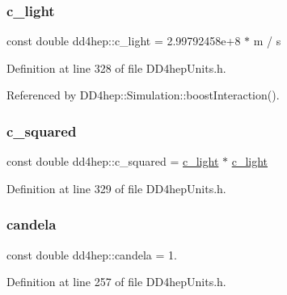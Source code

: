 \hypertarget{namespacedd4hep_abab5bebb73a5c3123d23fba7c326a0d5}{}\label{namespacedd4hep_abab5bebb73a5c3123d23fba7c326a0d5} 
\subsubsection{\texorpdfstring{c\+\_\+light}{c\_light}}
{\footnotesize\ttfamily const double dd4hep\+::c\+\_\+light = 2.\+99792458e+8 $\ast$ m / s\hspace{0.3cm}{\ttfamily [static]}}



Definition at line 328 of file D\+D4hep\+Units.\+h.



Referenced by D\+D4hep\+::\+Simulation\+::boost\+Interaction().

\hypertarget{namespacedd4hep_a1501a5f994e55104b62b1907ff652300}{}\label{namespacedd4hep_a1501a5f994e55104b62b1907ff652300} 
\subsubsection{\texorpdfstring{c\+\_\+squared}{c\_squared}}
{\footnotesize\ttfamily const double dd4hep\+::c\+\_\+squared = \hyperlink{namespacedd4hep_abab5bebb73a5c3123d23fba7c326a0d5}{c\+\_\+light} $\ast$ \hyperlink{namespacedd4hep_abab5bebb73a5c3123d23fba7c326a0d5}{c\+\_\+light}\hspace{0.3cm}{\ttfamily [static]}}



Definition at line 329 of file D\+D4hep\+Units.\+h.

\hypertarget{namespacedd4hep_ad6c9a17d1f654cad2f47f590edc1bec4}{}\label{namespacedd4hep_ad6c9a17d1f654cad2f47f590edc1bec4} 
\subsubsection{\texorpdfstring{candela}{candela}}
{\footnotesize\ttfamily const double dd4hep\+::candela = 1.\hspace{0.3cm}{\ttfamily [static]}}



Definition at line 257 of file D\+D4hep\+Units.\+h.

\hypertarget{namespacedd4hep_af17522b334712876a204971dee26c063}{}\label{namespacedd4hep_af17522b334712876a204971dee26c063} 
